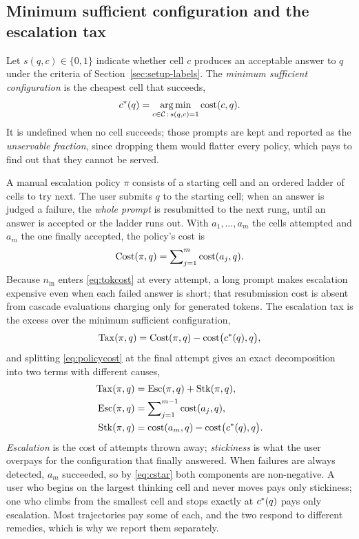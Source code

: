 \subsection{Minimum sufficient configuration and the escalation tax}
\label{sec:tax}

Let $s(q, c) \in \{0, 1\}$ indicate whether cell $c$ produces an acceptable
answer to $q$ under the criteria of Section~\ref{sec:setup-labels}. The
\emph{minimum sufficient configuration} is the cheapest cell that succeeds,
\begin{equation}
  c^{*}(q) = \operatorname*{arg\,min}_{c \in \mathcal{C} \,:\, s(q, c) = 1} \mathrm{cost}(c, q).
  \label{eq:cstar}
\end{equation}
It is undefined when no cell succeeds; those prompts are kept and reported as
the \emph{unservable fraction}, since dropping them would flatter every
policy, which pays to find out that they cannot be served.

A manual escalation policy $\pi$ consists of a starting cell and an ordered
ladder of cells to try next. The user submits $q$ to the starting cell; when
an answer is judged a failure, the \emph{whole prompt} is resubmitted to the
next rung, until an answer is accepted or the ladder runs out. With
$a_1, \dots, a_m$ the cells attempted and $a_m$ the one finally accepted, the
policy's cost is
\begin{equation}
  \mathrm{Cost}(\pi, q) = \sum\nolimits_{j=1}^{m} \mathrm{cost}(a_j, q).
  \label{eq:policycost}
\end{equation}
Because $n_{\mathrm{in}}$ enters \eqref{eq:tokcost} at every attempt, a long
prompt makes escalation expensive even when each failed answer is short; that
resubmission cost is absent from cascade evaluations charging only for
generated tokens. The escalation tax is the excess over the minimum
sufficient configuration,
\begin{equation}
  \mathrm{Tax}(\pi, q) = \mathrm{Cost}(\pi, q) - \mathrm{cost}\bigl(c^{*}(q), q\bigr),
  \label{eq:tax}
\end{equation}
and splitting \eqref{eq:policycost} at the final attempt gives an exact
decomposition into two terms with different causes,
\begin{align}
  \mathrm{Tax}(\pi, q) &= \mathrm{Esc}(\pi, q) + \mathrm{Stk}(\pi, q), \label{eq:decomp}\\
  \mathrm{Esc}(\pi, q) &= \sum\nolimits_{j=1}^{m-1} \mathrm{cost}(a_j, q), \nonumber\\
  \mathrm{Stk}(\pi, q) &= \mathrm{cost}(a_m, q) - \mathrm{cost}\bigl(c^{*}(q), q\bigr). \nonumber
\end{align}
\emph{Escalation} is the cost of attempts thrown away; \emph{stickiness} is
what the user overpays for the configuration that finally answered. When
failures are always detected, $a_m$ succeeded, so by \eqref{eq:cstar} both
components are non-negative. A user who begins on the largest thinking cell
and never moves pays only stickiness; one who climbs from the smallest cell
and stops exactly at $c^{*}(q)$ pays only escalation. Most trajectories pay
some of each, and the two respond to different remedies, which is why we
report them separately.

